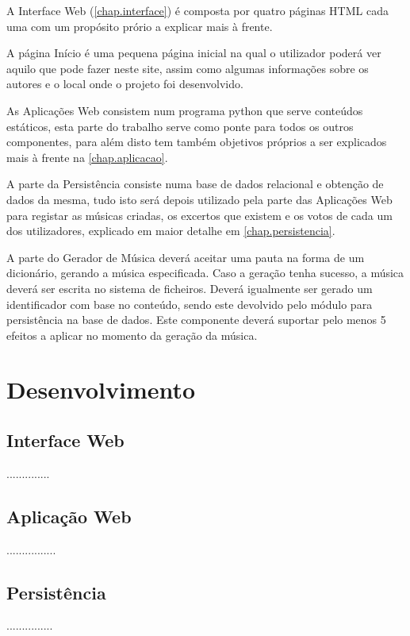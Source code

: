\documentclass{report}
\begin{document}
A Interface Web (\autoref{chap.interface}) é composta por quatro páginas HTML cada uma com 
um propósito prório a explicar mais à frente.

A página Início é uma pequena página inicial na qual o utilizador poderá ver 
aquilo que pode fazer neste site, assim como algumas informações sobre os autores e o local onde o projeto foi desenvolvido.
	
As Aplicações Web consistem num programa python que serve conteúdos estáticos, 
esta parte do trabalho serve como ponte para todos os outros componentes, para além disto tem também objetivos próprios a ser 
explicados mais à frente na \autoref{chap.aplicacao}.

A parte da Persistência consiste numa base de dados relacional e obtenção de dados da mesma, 
tudo isto será depois utilizado pela parte das Aplicações Web para registar as músicas criadas, os excertos que existem e os 
votos de cada um dos utilizadores, explicado em maior detalhe em \autoref{chap.persistencia}.

A parte do Gerador de Música deverá aceitar uma pauta na forma de um dicionário, gerando a música
especificada. Caso a geração tenha sucesso, a música deverá ser escrita no sistema de
ficheiros. Deverá igualmente ser gerado um identificador com base no conteúdo, sendo
este devolvido pelo módulo para persistência na base de dados.
Este componente deverá suportar pelo menos 5 efeitos a aplicar no momento da geração
da música.

\chapter{Desenvolvimento}
\label{chap.desenvolvimento}
	
\section{Interface Web}
\label{chap.interface}
..............

\section{Aplicação Web}
\label{chap.aplicacao}
................

\section{Persistência}
\label{chap.persistencia}
...............
\end{document}
